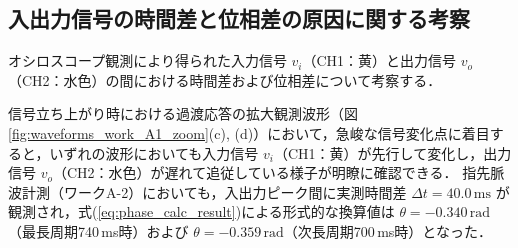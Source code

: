 \subsection{入出力信号の時間差と位相差の原因に関する考察}

オシロスコープ観測により得られた入力信号 $v_i$（CH1：黄）と出力信号 $v_o$（CH2：水色）の間における時間差および位相差について考察する．

信号立ち上がり時における過渡応答の拡大観測波形（図\ref{fig:waveforms_work_A1_zoom}(c), (d)）において，急峻な信号変化点に着目すると，いずれの波形においても入力信号 $v_i$（CH1：黄）が先行して変化し，出力信号 $v_o$（CH2：水色）が遅れて追従している様子が明瞭に確認できる．
指先脈波計測（ワークA-2）においても，入出力ピーク間に実測時間差 $\Delta t = 40.0\,\mathrm{ms}$ が観測され，式(\ref{eq:phase_calc_result})による形式的な換算値は $\theta = -0.340\,\mathrm{rad}$（最長周期740\,ms時）および $\theta = -0.359\,\mathrm{rad}$（次長周期700\,ms時）となった．

